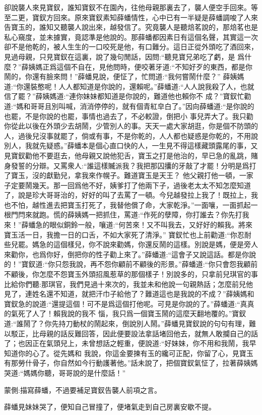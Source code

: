 \begin{parag}
    卻說襲人來見寶釵，誰知寶釵不在園內，往他母親那裏去了，襲人便空手回來。等至二更，寶釵方回來。原來寶釵素知薛蟠情性，心中已有一半疑是薛蟠調唆了人來告寶玉的，誰知又聽襲人說出來，越發信了。究竟襲人是聽焙茗說的，那焙茗也是私心窺度，並未據實，竟認準是他說的。那薛蟠都因素日有這個名聲，其實這一次卻不是他乾的，被人生生的一口咬死是他，有口難分。這日正從外頭吃了酒回來，見過母親，只見寶釵在這裏，說了幾句閒話，因問:“聽見寶兄弟吃了虧，是 爲什麼？”薛姨媽正爲這個不自在，見他問時，便咬著牙道:“不知好歹的東西，都是你鬧的，你還有臉來問！”薛蟠見說，便怔了，忙問道:“我何嘗鬧什麼？” 薛姨媽道:“你還裝憨呢！人人都知道是你說的，還賴呢。”薛蟠道:“人人說我殺了人，也就信了罷？”薛姨媽道:“連你妹妹都知道是你說的，難道他也賴你不 成？”寶釵忙勸道:“媽和哥哥且別叫喊，消消停停的，就有個青紅皁白了。”因向薛蟠道:“是你說的也罷，不是你說的也罷，事情也過去了，不必較證，倒把小 事兒弄大了。我只勸你從此以後在外頭少去胡鬧，少管別人的事。天天一處大家胡逛，你是個不防頭的人，過後兒沒事就罷了，倘或有事，不是你乾的，人人都也疑惑是你乾的，不用說別人，我就先疑惑。”薛蟠本是個心直口快的人，一生見不得這樣藏頭露尾的事，又見寶釵勸他不要逛去，他母親又說他犯舌，寶玉之打是他治的，早已急的亂跳，賭身發誓的分辯。又罵衆人:“誰這樣贓派我？我把那囚攮的牙敲了才罷！分明是爲打了寶玉，沒的獻勤兒，拿我來作幌子。難道寶玉是天王？ 他父親打他一頓，一家子定要鬧幾天。那一回爲他不好，姨爹打了他兩下子，過後老太太不知怎麼知道了，說是珍大哥哥治的，好好的叫了去罵了一頓。今兒越發拉上我了！既拉上，我也不怕，越性進去把寶玉打死了，我替他償了命，大家乾淨。”一面嚷，一面抓起一根門閂來就跑。慌的薛姨媽一把抓住，罵道:“作死的孽障，你打誰去？你先打我來！”薛蟠急的眼似銅鈴一般，嚷道:“何苦來！又不叫我去，又好好的賴我。將來寶玉活一日，我擔一日的口舌，不如大家死了清淨。” 寶釵忙也上前勸道:“你忍耐些兒罷。媽急的這個樣兒，你不說來勸媽，你還反鬧的這樣。別說是媽，便是旁人來勸你，也爲你好，倒把你的性子勸上來了。”薛蟠道:“這會子又說這話。都是你說的！”寶釵道:“你只怨我說，再不怨你顧前不顧後的形景。”薛蟠道:“你只會怨我顧前不顧後，你怎麼不怨寶玉外頭招風惹草的那個樣子！別說多的，只拿前兒琪官的事比給你們聽:那琪官，我們見過十來次的，我並未和他說一句親熱話；怎麼前兒他見了，連姓名還不知道，就把汗巾子給他了？難道這也是我說的不成？”薛姨媽和寶釵急的說道:“還提這個！可不是爲這個打他呢。可見是你說的了。”薛蟠道:“真真的氣死了人了！賴我說的我不 惱，我只爲一個寶玉鬧的這麼天翻地覆的。”寶釵道:“誰鬧了？你先持刀動杖的鬧起來，倒說別人鬧。”薛蟠見寶釵說的句句有理，難以駁正，比母親的話反難回答，因此便要設法拿話堵回他去，就無人敢攔自己的話了；也因正在氣頭兒上，未曾想話之輕重，便說道:“好妹妹，你不用和我鬧，我早知道你的心了。從先媽和 我說，你這金要揀有玉的纔可正配，你留了心，見寶玉有那勞什骨子，你自然如今行動護著他。”話未說了，把個寶釵氣怔了，拉著薛姨媽哭道:“媽媽你聽，哥哥說的是什麼話！”\begin{note}蒙側:描寫薛蟠，不過要補足寶釵告襲人前項之言。\end{note}薛蟠見妹妹哭了，便知自己冒撞了，便堵氣走到自己房裏安歇不提。
\end{parag}



